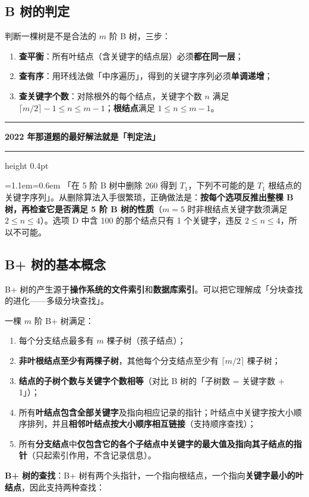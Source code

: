\documentclass[11pt,openany,UTF8]{ctexbook}
\newcommand{\callouthead}[2]{%
  \par\addvspace{7pt}\noindent
  {\color{#1}\rule[-0.15em]{3pt}{1.05em}}\hspace{0.5em}%
  {\bfseries\color{#1}#2}\par\nobreak\vspace{-0.35em}%
  {\color{rulesep}\hrule height 0.4pt}\nobreak\vspace{0.45em}%
  \begingroup\small\setlength{\parindent}{0pt}%
  \leftskip=1.1em\rightskip=0.6em\noindent\ignorespaces}
\newcommand{\calloutend}{\par\endgroup\addvspace{7pt}}
\newenvironment{callexam}[1]{\callouthead{exambar}{#1}}{\calloutend}
\begin{document}
\subsection{B 树的判定}

判断一棵树是不是合法的 $m$ 阶 B 树，三步：

\begin{enumerate}
\item \textbf{查平衡}：所有叶结点（含关键字的结点层）必须\textbf{都在同一层}；
\item \textbf{查有序}：用环线法做「中序遍历」，得到的关键字序列必须\textbf{单调递增}；
\item \textbf{查关键字个数}：对除根外的每个结点，关键字个数 $n$ 满足 $\lceil m/2\rceil-1\le n\le m-1$；\textbf{根结点}满足 $1\le n\le m-1$。
\end{enumerate}
\begin{callexam}{2022 年那道题的最好解法就是「判定法」}
「在 5 阶 B 树中删除 260 得到 $T_1$，下列不可能的是 $T_1$ 根结点的关键字序列」。从删除算法入手很繁琐，正确做法是：\textbf{按每个选项反推出整棵 B 树，再检查它是否满足 5 阶 B 树的性质}（$m=5$ 时非根结点关键字数须满足 $2\le n\le 4$）。选项 D 中含 100 的那个结点只有 1 个关键字，违反 $2\le n\le 4$，所以不可能。

\end{callexam}

\subsection{B+ 树的基本概念}

B+ 树的产生源于\textbf{操作系统的文件索引}和\textbf{数据库索引}。可以把它理解成「分块查找的进化——多级分块查找」。

一棵 $m$ 阶 B+ 树满足：

\begin{enumerate}
\item 每个分支结点最多有 $m$ 棵子树（孩子结点）；
\item \textbf{非叶根结点至少有两棵子树}，其他每个分支结点至少有 $\lceil m/2\rceil$ 棵子树；
\item \textbf{结点的子树个数与关键字个数相等}（对比 B 树的「子树数 = 关键字数 + 1」）；
\item 所有\textbf{叶结点包含全部关键字}及指向相应记录的指针；叶结点中关键字按大小顺序排列，并且\textbf{相邻叶结点按大小顺序相互链接}（支持顺序查找）；
\item 所有\textbf{分支结点}中\textbf{仅包含它的各个子结点中关键字的最大值及指向其子结点的指针}（只起索引作用，不含记录信息）。
\end{enumerate}
\textbf{B+ 树的查找}：B+ 树有两个头指针，一个指向根结点，一个指向\textbf{关键字最小的叶结点}，因此支持两种查找：
\end{document}

